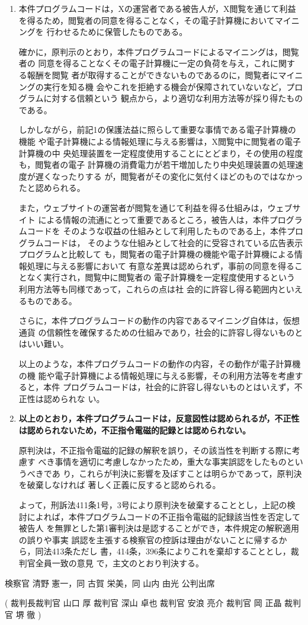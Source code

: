 \documentclass[12pt,a4paper]{ltjsarticle}
\begin{document}
\begin{enumerate}
  \item 本件プログラムコードは，Xの運営者である被告人が，X閲覧を通じて利益
        を得るため，閲覧者の同意を得ることなく，その電子計算機においてマイニングを
        行わせるために保管したものである。

        確かに，原判示のとおり，本件プログラムコードによるマイニングは，閲覧者の
        同意を得ることなくその電子計算機に一定の負荷を与え，これに関する報酬を閲覧
        者が取得することができないものであるのに，閲覧者にマイニングの実行を知る機
        会やこれを拒絶する機会が保障されていないなど，プログラムに対する信頼という
        観点から，より適切な利用方法等が採り得たものである。

        しかしながら，前記1の保護法益に照らして重要な事情である電子計算機の機能
        や電子計算機による情報処理に与える影響は，X閲覧中に閲覧者の電子計算機の中
        央処理装置を一定程度使用することにとどまり，その使用の程度も，閲覧者の電子
        計算機の消費電力が若干増加したり中央処理装置の処理速度が遅くなったりする
        が，閲覧者がその変化に気付くほどのものではなかったと認められる。

        また，ウェブサイトの運営者が閲覧を通じて利益を得る仕組みは，ウェブサイト
        による情報の流通にとって重要であるところ，被告人は，本件プログラムコードを
        そのような収益の仕組みとして利用したものである上，本件プログラムコードは，
        そのような仕組みとして社会的に受容されている広告表示プログラムと比較して
        も，閲覧者の電子計算機の機能や電子計算機による情報処理に与える影響において
        有意な差異は認められず，事前の同意を得ることなく実行され，閲覧中に閲覧者の
        電子計算機を一定程度使用するという利用方法等も同様であって，これらの点は社
        会的に許容し得る範囲内といえるものである。

        さらに，本件プログラムコードの動作の内容であるマイニング自体は，仮想通貨
        の信頼性を確保するための仕組みであり，社会的に許容し得ないものとはいい難い。

        以上のような，本件プログラムコードの動作の内容，その動作が電子計算機の機
        能や電子計算機による情報処理に与える影響，その利用方法等を考慮すると，本件
        プログラムコードは，社会的に許容し得ないものとはいえず，不正性は認められな
        い。

  \item \textbf{以上のとおり，本件プログラムコードは，反意図性は認められるが，不正性
        は認められないため，不正指令電磁的記録とは認められない。}

 原判決は，不正指令電磁的記録の解釈を誤り，その該当性を判断する際に考慮す
 べき事情を適切に考慮しなかったため，重大な事実誤認をしたものというべきであ
 り，これらが判決に影響を及ぼすことは明らかであって，原判決を破棄しなければ
 著しく正義に反すると認められる。

 よって，刑訴法411条1号，3号により原判決を破棄することとし，上記の検
 討によれば，本件プログラムコードの不正指令電磁的記録該当性を否定して被告人
 を無罪とした第1審判決は是認することができ，本件規定の解釈適用の誤りや事実
 誤認を主張する検察官の控訴は理由がないことに帰するから，同法413条ただし
 書，414条，396条によりこれを棄却することとし，裁判官全員一致の意見
 で，主文のとおり判決する。
 \end{enumerate}
 検察官 清野 憲一，同 古賀 栄美，同 山内 由光 公判出席

 (
 裁判長裁判官 山口 厚\quad
 裁判官 深山 卓也\quad
 裁判官 安浪 亮介\quad
 裁判官 岡 正晶\quad
 裁判官 堺 徹
   )
\end{document}
